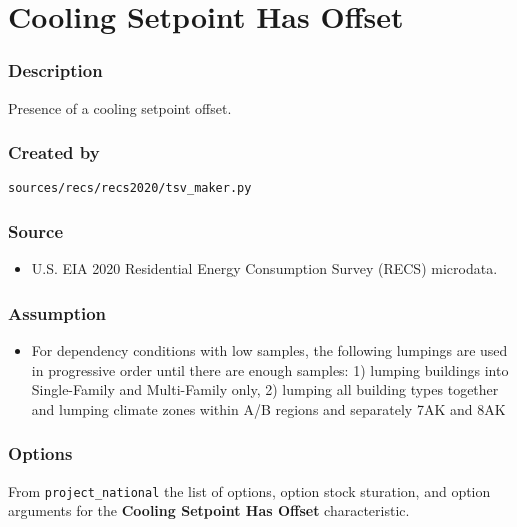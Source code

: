\section{Cooling Setpoint Has
Offset}\label{cooling_setpoint_has_offset}

\subsubsection{Description}\label{description-23}

Presence of a cooling setpoint offset.

\subsubsection{Created by}\label{created-by-23}

\texttt{sources/recs/recs2020/tsv\_maker.py}

\subsubsection{Source}\label{source-23}

\begin{itemize}
 
\item
  U.S. EIA 2020 Residential Energy Consumption Survey (RECS) microdata.
\end{itemize}

\subsubsection{Assumption}\label{assumption-14}

\begin{itemize}
 
\item
  For dependency conditions with low samples, the following lumpings are
  used in progressive order until there are enough samples: 1) lumping
  buildings into Single-Family and Multi-Family only, 2) lumping all
  building types together and lumping climate zones within A/B regions
  and separately 7AK and 8AK
\end{itemize}

\subsubsection{Options}\label{options-23}

From \texttt{project\_national} the list of options, option stock
sturation, and option arguments for the \textbf{Cooling Setpoint Has
Offset} characteristic.

